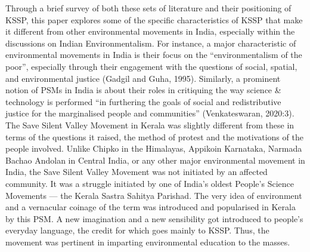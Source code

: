 \documentclass[twoside, 13pt]{article}
\begin{document}
\newpage
{\fontsize{12}{14}\selectfont Through a brief survey of both these sets of literature and their positioning of KSSP, this paper explores some of the specific characteristics of KSSP that make it different from other environmental movements in India, especially within the discussions on Indian Environmentalism. For instance, a major characteristic of environmental movements in India is their focus on the “environmentalism of the poor”, especially through their engagement with the questions of social, spatial, and environmental justice (Gadgil and Guha, 1995). Similarly, a prominent notion of PSMs in India is about their roles in critiquing the way science \& technology is performed “in furthering the goals of social and redistributive justice for the marginalised people and communities” (Venkateswaran, 2020:3). The Save Silent Valley Movement in Kerala was slightly different from these in terms of the questions it raised, the method of protest and the motivations of the people involved. Unlike Chipko in the Himalayas, Appikoin Karnataka, Narmada Bachao Andolan in Central India, or any other major environmental movement in India, the Save Silent Valley Movement was not initiated by an affected community. It was a struggle initiated by one of India’s oldest People’s Science Movements — the Kerala Sastra Sahitya Parishad. The very idea of environment and a vernacular coinage of the term was introduced and popularised in Kerala by this PSM. A new imagination and a new sensibility got introduced to people’s everyday language, the credit for which goes mainly to KSSP. Thus, the movement was pertinent in imparting environmental education to the masses.}
\end{document}
